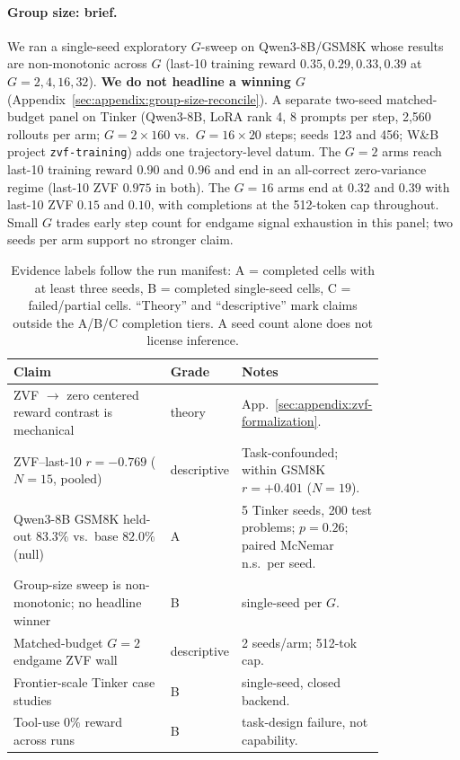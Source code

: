 \documentclass{article}
\begin{document}
\paragraph{Group size: brief.}
We ran a single-seed exploratory $G$-sweep on Qwen3-8B/GSM8K whose results
are non-monotonic across $G$ (last-10 training reward $0.35, 0.29, 0.33, 0.39$
at $G{=}2,4,16,32$). \textbf{We do not headline a winning $G$}
(Appendix~\ref{sec:appendix:group-size-reconcile}). A separate two-seed matched-budget panel on
Tinker (Qwen3-8B, LoRA rank 4, 8 prompts per step, 2{,}560 rollouts per arm;
$G{=}2\times160$ vs.\ $G{=}16\times20$ steps; seeds 123 and 456; W\&B project
\texttt{zvf-training}) adds one trajectory-level datum. The $G{=}2$ arms
reach last-10 training reward $0.90$ and $0.96$ and end in an all-correct
zero-variance regime (last-10 ZVF $0.975$ in both). The $G{=}16$ arms end at
$0.32$ and $0.39$ with last-10 ZVF $0.15$ and $0.10$, with completions at the
512-token cap throughout. Small $G$ trades early step count for endgame
signal exhaustion in this panel; two seeds per arm support no stronger claim.

\begin{table}[htbp]
\centering\small
\setlength{\tabcolsep}{4pt}
\caption{Evidence labels follow the run manifest: A = completed cells with
at least three seeds, B = completed single-seed cells, C = failed/partial
cells. ``Theory'' and ``descriptive'' mark claims outside the
A/B/C completion tiers. A seed count alone does not license inference.}
\label{tab:evidence-grade}
\begin{tabular}{@{}p{0.50\linewidth} l p{0.32\linewidth}@{}}
\toprule
\textbf{Claim} & \textbf{Grade} & \textbf{Notes} \\
\midrule
ZVF $\to$ zero centered reward contrast is mechanical & theory & App.~\ref{sec:appendix:zvf-formalization}. \\
ZVF--last-10 $r{=}-0.769$ ($N{=}15$, pooled) & descriptive & Task-confounded; within GSM8K $r{=}+0.401$ ($N{=}19$). \\
Qwen3-8B GSM8K held-out $83.3\%$ vs.\ base $82.0\%$ (null) & A & 5 Tinker seeds, 200 test problems; $p{=}0.26$; paired McNemar n.s.\ per seed. \\
Group-size sweep is non-monotonic; no headline winner & B & single-seed per $G$. \\
Matched-budget $G{=}2$ endgame ZVF wall & descriptive & 2 seeds/arm; 512-tok cap. \\
Frontier-scale Tinker case studies & B & single-seed, closed backend. \\
Tool-use $0\%$ reward across runs & B & task-design failure, not capability. \\
\bottomrule
\end{tabular}
\end{table}
\end{document}

